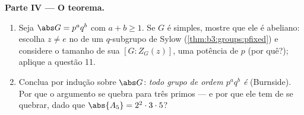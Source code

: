 \begin{problem}
\medskip
\noindent\textbf{Parte IV --- O teorema.}
\begin{enumerate}[resume]
  \item Seja $\abs G = p^aq^b$ com $a + b \geq 1$. Se $G$ é simples, mostre que ele é
        abeliano: escolha $z \neq e$ no  de um $q$-subgrupo de
        Sylow (\cref{thm:b3:groups:pfixed}) e considere o tamanho de sua  $[G : Z_G(z)]$, uma potência de $p$ (por quê?); aplique a
        questão 11.
  \item Conclua por indução sobre $\abs G$: \emph{todo grupo de
        ordem $p^aq^b$ é } (Burnside). Por que o argumento
        se quebra para três primos --- e por que ele tem de se quebrar,
        dado que $\abs{A_5} = 2^2\cdot3\cdot5$?
\end{enumerate}


\end{problem}
